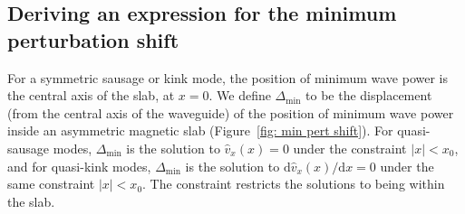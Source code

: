 \subsection{Deriving an expression for the minimum perturbation shift} \label{sec: MPS derivation}

For a symmetric sausage or kink mode, the position of minimum wave power is the central axis of the slab, at $x = 0$. We define $\Delta_\textrm{min}$ to be the displacement (from the central axis of the waveguide) of the position of minimum wave power inside an asymmetric magnetic slab (Figure~\ref{fig: min pert shift}). For quasi-sausage modes, $\Delta_\textrm{min}$ is the solution to $\widehat{v}_x(x) = 0$ under the constraint $|x| < x_0$, and for quasi-kink modes, $\Delta_\textrm{min}$ is the solution to $\textrm{d}\widehat{v}_x (x) / \textrm{d}x = 0$ under the same constraint $|x| < x_0$. The constraint restricts the solutions to being within the slab. 

